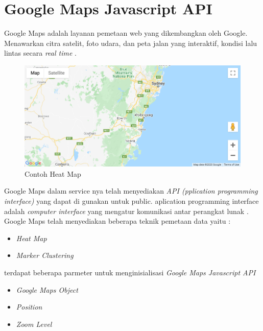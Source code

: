 \section{Google Maps Javascript API}
\label{sec:googlemaps}
Google Maps adalah layanan pemetaan web yang dikembangkan oleh Google. Menawarkan citra satelit, foto udara, dan peta jalan yang interaktif, kondisi lalu lintas secara \textit{real time} \cite{mehta:19:gmaps}.
 \begin{figure}[H]
    \centering
    \includegraphics[scale=0.5]{Gambar/example_google_map.PNG}
    \caption{Contoh Heat Map }
    \label{fig:my_label}
\end{figure}
Google Maps dalam service nya telah menyediakan \textit{API (pplication programming interface)} yang dapat di gunakan untuk public.
aplication programming interface adalah \textit{computer interface} yang mengatur komunikasi antar perangkat lunak \cite{libby:20:api}.
Google Maps telah menyediakan beberapa teknik pemetaan data yaitu :
 \begin{itemize}
     \item \textit{Heat Map}
     \item \textit{Marker Clustering}

 \end{itemize}
 terdapat beberapa parmeter untuk menginisialisasi \textit{Google Maps Javascript API}
 \begin{itemize}
     \item \textit{Google Maps Object}
     \item \textit{Position}
     \item \textit{Zoom Level}
 \end{itemize}
 
